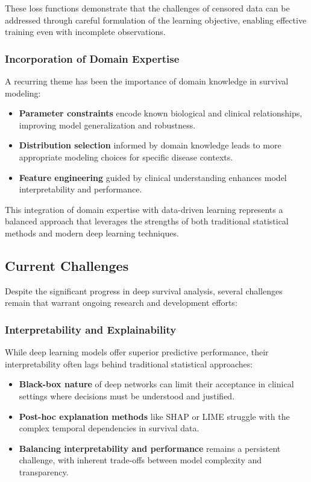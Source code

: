 These loss functions demonstrate that the challenges of censored data can be addressed through careful formulation of the learning objective, enabling effective training even with incomplete observations.

\subsubsection{Incorporation of Domain Expertise}

A recurring theme has been the importance of domain knowledge in survival modeling:

\begin{itemize}
    \item \textbf{Parameter constraints} encode known biological and clinical relationships, improving model generalization and robustness.
    
    \item \textbf{Distribution selection} informed by domain knowledge leads to more appropriate modeling choices for specific disease contexts.
    
    \item \textbf{Feature engineering} guided by clinical understanding enhances model interpretability and performance.
\end{itemize}

This integration of domain expertise with data-driven learning represents a balanced approach that leverages the strengths of both traditional statistical methods and modern deep learning techniques.

\subsection{Current Challenges}

Despite the significant progress in deep survival analysis, several challenges remain that warrant ongoing research and development efforts:

\subsubsection{Interpretability and Explainability}

While deep learning models offer superior predictive performance, their interpretability often lags behind traditional statistical approaches:

\begin{itemize}
    \item \textbf{Black-box nature} of deep networks can limit their acceptance in clinical settings where decisions must be understood and justified.
    
    \item \textbf{Post-hoc explanation methods} like SHAP or LIME struggle with the complex temporal dependencies in survival data.
    
    \item \textbf{Balancing interpretability and performance} remains a persistent challenge, with inherent trade-offs between model complexity and transparency.
\end{itemize}

